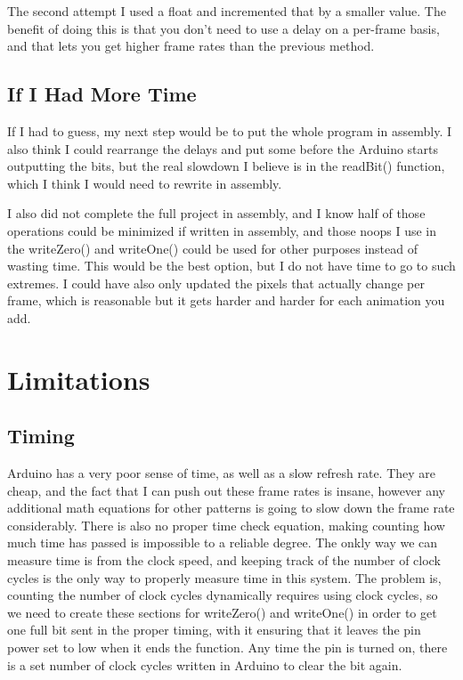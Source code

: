 \documentclass{scrartcl}
\begin{document}
The second attempt I used a float and incremented that by a smaller value. The benefit of doing this is that you don't need to use a delay on a per-frame basis, and that lets you get higher frame rates than the previous method.

\subsection{If I Had More Time}

If I had to guess, my next step would be to put the whole program in assembly. I also think I could rearrange the delays and put some before the Arduino starts outputting the bits, but the real slowdown I believe is in the readBit() function, which I think I would need to rewrite in assembly.

I also did not complete the full project in assembly, and I know half of those operations could be minimized if written in assembly, and those noops I use in the writeZero() and writeOne() could be used for other purposes instead of wasting time. This would be the best option, but I do not have time to go to such extremes. I could have also only updated the pixels that actually change per frame, which is reasonable but it gets harder and harder for each animation you add.

\section{Limitations}

\subsection{Timing}
Arduino has a very poor sense of time, as well as a slow refresh rate. They are cheap, and the fact that I can push out these frame rates is insane, however any additional math equations for other patterns is going to slow down the frame rate considerably. There is also no proper time check equation, making counting how much time has passed is impossible to a reliable degree. The onkly way we can measure time is from the clock speed, and keeping track of the number of clock cycles is the only way to properly measure time in this system. The problem is, counting the number of clock cycles dynamically requires using clock cycles, so we need to create these sections for writeZero() and writeOne() in order to get one full bit sent in the proper timing, with it ensuring that it leaves the pin power set to low when it ends the function. Any time the pin is turned on, there is a set number of clock cycles written in Arduino to clear the bit again.
\end{document}
